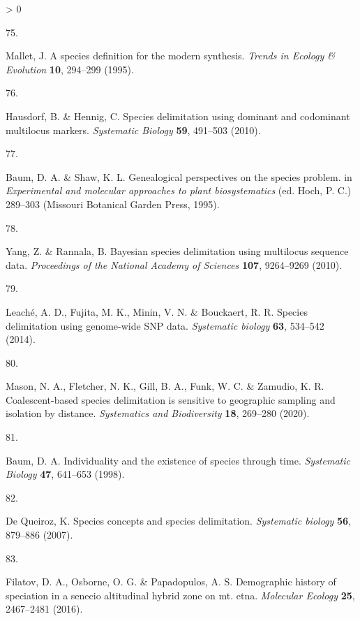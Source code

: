 \documentclass[
  11pt,
]{article}
\newlength{\cslhangindent}
\newlength{\csllabelwidth}
\newenvironment{CSLReferences}[2] %
 {%
  \setlength{\parindent}{0pt}
  \ifodd #1 \everypar{\setlength{\hangindent}{\cslhangindent}}\ignorespaces\fi
  \ifnum #2 > 0
  \setlength{\parskip}{#2\baselineskip}
  \fi
 }%
 {}
\newcommand{\CSLLeftMargin}[1]{\parbox[t]{\csllabelwidth}{#1}}
\newcommand{\CSLRightInline}[1]{\parbox[t]{\linewidth - \csllabelwidth}{#1}\break}
\begin{document}
\begin{CSLReferences}{0}{0}
\leavevmode\hypertarget{ref-mallet1995species}{}%
\CSLLeftMargin{75. }
\CSLRightInline{Mallet, J. A species definition for the modern synthesis. \emph{Trends in Ecology \& Evolution} \textbf{10}, 294--299 (1995).}

\leavevmode\hypertarget{ref-hausdorf2010species}{}%
\CSLLeftMargin{76. }
\CSLRightInline{Hausdorf, B. \& Hennig, C. Species delimitation using dominant and codominant multilocus markers. \emph{Systematic Biology} \textbf{59}, 491--503 (2010).}

\leavevmode\hypertarget{ref-baum1995genealogical}{}%
\CSLLeftMargin{77. }
\CSLRightInline{Baum, D. A. \& Shaw, K. L. {Genealogical perspectives on the species problem}. in \emph{Experimental and molecular approaches to plant biosystematics} (ed. Hoch, P. C.) 289--303 (Missouri Botanical Garden Press, 1995).}

\leavevmode\hypertarget{ref-yang2010bayesian}{}%
\CSLLeftMargin{78. }
\CSLRightInline{Yang, Z. \& Rannala, B. Bayesian species delimitation using multilocus sequence data. \emph{Proceedings of the National Academy of Sciences} \textbf{107}, 9264--9269 (2010).}

\leavevmode\hypertarget{ref-leache2014species}{}%
\CSLLeftMargin{79. }
\CSLRightInline{Leaché, A. D., Fujita, M. K., Minin, V. N. \& Bouckaert, R. R. Species delimitation using genome-wide SNP data. \emph{Systematic biology} \textbf{63}, 534--542 (2014).}

\leavevmode\hypertarget{ref-mason2020coalescent}{}%
\CSLLeftMargin{80. }
\CSLRightInline{Mason, N. A., Fletcher, N. K., Gill, B. A., Funk, W. C. \& Zamudio, K. R. Coalescent-based species delimitation is sensitive to geographic sampling and isolation by distance. \emph{Systematics and Biodiversity} \textbf{18}, 269--280 (2020).}

\leavevmode\hypertarget{ref-baum1998individuality}{}%
\CSLLeftMargin{81. }
\CSLRightInline{Baum, D. A. Individuality and the existence of species through time. \emph{Systematic Biology} \textbf{47}, 641--653 (1998).}

\leavevmode\hypertarget{ref-de2007species}{}%
\CSLLeftMargin{82. }
\CSLRightInline{De Queiroz, K. Species concepts and species delimitation. \emph{Systematic biology} \textbf{56}, 879--886 (2007).}

\leavevmode\hypertarget{ref-filatov2016demographic}{}%
\CSLLeftMargin{83. }
\CSLRightInline{Filatov, D. A., Osborne, O. G. \& Papadopulos, A. S. Demographic history of speciation in a senecio altitudinal hybrid zone on mt. etna. \emph{Molecular Ecology} \textbf{25}, 2467--2481 (2016).}


\end{CSLReferences}
\end{document}
